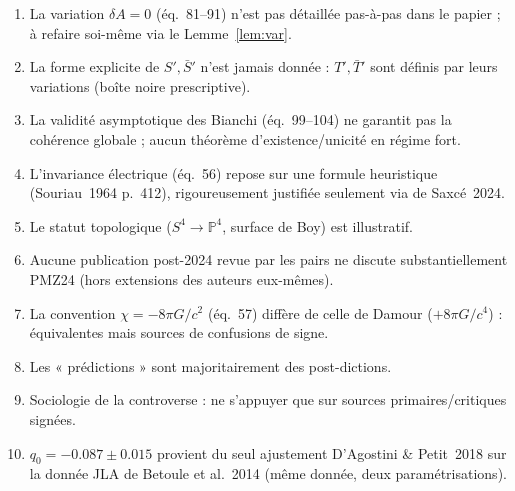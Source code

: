 \documentclass[11pt,a4paper]{article}
\theoremstyle{definition}
\theoremstyle{plain}
\newcommand{\Sbar}{\bar{S}}
\newcommand{\Tbarp}{\bar{T}'}
\newcommand{\eqpaper}[1]{\textsf{(éq.~#1)}}   %
\begin{document}
\begin{enumerate}[leftmargin=1.6em,nosep]
\item La variation $\delta A=0$ \eqpaper{81--91} n'est pas détaillée pas-à-pas dans le papier ;
à refaire soi-même via le Lemme~\ref{lem:var}.
\item La forme explicite de $S',\Sbar'$ n'est jamais donnée : $T',\Tbarp$ sont définis par leurs
variations (boîte noire prescriptive).
\item La validité asymptotique des Bianchi \eqpaper{99--104} ne garantit pas la cohérence
globale ; aucun théorème d'existence/unicité en régime fort.
\item L'invariance électrique \eqpaper{56} repose sur une formule heuristique
(Souriau~1964 p.~412), rigoureusement justifiée seulement via de Saxcé~2024.
\item Le statut topologique ($S^4\to\mathbb P^4$, surface de Boy) est illustratif.
\item Aucune publication post-2024 revue par les pairs ne discute substantiellement PMZ24
(hors extensions des auteurs eux-mêmes).
\item La convention $\chi=-8\pi G/c^2$ \eqpaper{57} diffère de celle de Damour ($+8\pi G/c^4$) :
équivalentes mais sources de confusions de signe.
\item Les « prédictions » sont majoritairement des post-dictions.
\item Sociologie de la controverse : ne s'appuyer que sur sources primaires/critiques signées.
\item $q_0=-0.087\pm0.015$ provient du seul ajustement D'Agostini \& Petit~2018 sur la donnée
JLA de Betoule et al.~2014 (même donnée, deux paramétrisations).
\end{enumerate}
\end{document}
